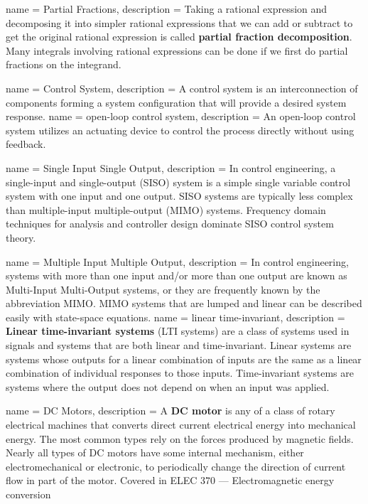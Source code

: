 {
	name = {Partial Fractions},
	description = {
		Taking a rational expression and decomposing it into simpler rational expressions that we can add or subtract to get the original rational expression is called \textbf{partial fraction decomposition}.  Many integrals involving rational expressions can be done if we first do partial fractions on the integrand.}
}

{
	name = {Control System},
	description = {
		A control system is an interconnection of components forming a system configuration that will provide a desired system response.
	}
}
{
	name = {open-loop control system},
	description = {
		An open-loop control system utilizes an actuating device to control the process
		directly without using feedback.
	}
}

{
	name = {Single Input Single Output},
	description = {
		In control engineering, a single-input and single-output (SISO) system is a simple single variable control system with one input and one output. SISO systems are typically less complex than multiple-input multiple-output (MIMO) systems. Frequency domain techniques for analysis and controller design dominate SISO control system theory. }
}

{
	name = {Multiple Input Multiple Output},
	description = {
		In control engineering, systems with more than one input and/or more than one output are known as Multi-Input Multi-Output systems, or they are frequently known by the abbreviation MIMO. MIMO systems that are lumped and linear can be described easily with state-space equations.}
}
{
	name = {linear time-invariant},
	description = {
		\textbf{Linear time-invariant systems} (LTI systems) are a class of systems used in signals and systems that are both linear and time-invariant. Linear systems are systems whose outputs for a linear combination of inputs are the same as a linear combination of individual responses to those inputs. Time-invariant systems are systems where the output does not depend on when an input was applied. 
	}
}

{
	name = {DC Motors},
	description = {
	A \textbf{DC motor} is any of a class of rotary electrical machines that converts direct current electrical energy into mechanical energy. The most common types rely on the forces produced by magnetic fields. Nearly all types of DC motors have some internal mechanism, either electromechanical or electronic, to periodically change the direction of current flow in part of the motor. Covered in ELEC 370  --- Electromagnetic energy conversion
	}
}

